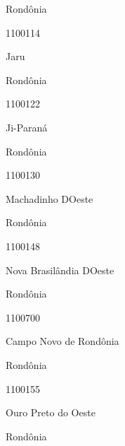 \documentclass[
  letterpaper,
]{report}
\begin{document}
\n    

\n      

Rondônia

\n      

1100114

\n      

Jaru

\n    

\n    

\n      

Rondônia

\n      

1100122

\n      

Ji-Paraná

\n    

\n    

\n      

Rondônia

\n      

1100130

\n      

Machadinho D\textquotesingle Oeste

\n    

\n    

\n      

Rondônia

\n      

1100148

\n      

Nova Brasilândia D\textquotesingle Oeste

\n    

\n    

\n      

Rondônia

\n      

1100700

\n      

Campo Novo de Rondônia

\n    

\n    

\n      

Rondônia

\n      

1100155

\n      

Ouro Preto do Oeste

\n    

\n    

\n      

Rondônia

\n      
\end{document}
